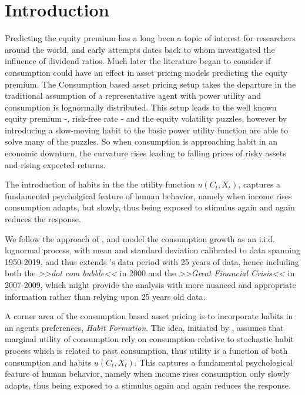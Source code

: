\section{Introduction} \label{sec:Introduction}

Predicting the equity premium has a long been a topic of interest for researchers around the world, and early attempts dates back to \cite{Dow1920} whom investigated the influence of dividend ratios. Much later the literature began to consider if consumption could have an effect in asset pricing models predicting the equity premium. The Consumption based asset pricing setup takes the departure in the traditional assumption of a representative agent with power utility and consumption is lognormally distributed. This setup leads to the well known equity premium -, risk-free rate - and the equity volatility puzzles, however by introducing a slow-moving habit to the basic power utility function \cite{Campbell1999} are able to solve many of the puzzles. So when consumption is approaching habit in an economic downturn, the curvature rises leading to falling prices of risky assets and rising expected returns. 


The introduction of habits in the the utility function $u \left(C_t, X_t \right)$, captures a fundamental psycholgical feature of human behavior, namely when income rises consumption adapts, but slowly, thus being exposed to stimulus again and again reduces the response.

We follow the approach of \cite{Campbell1999}, and model the consumption growth as an i.i.d. lognormal process, with mean and standard deviation calibrated to data spanning 1950-2019, and thus extends \cite{Campbell1999}'s data period with 25 years of data, hence including both the \textit{>>dot com bubble<<} in 2000 and the \textit{>>Great Financial Crisis<<} in 2007-2009, which might provide the analysis with more nuanced and appropriate information rather than relying upon 25 years old data.




\midrule

A corner area of the consumption based asset pricing is to incorporate habits in an agents preferences, \textit{Habit Formation}. The idea, initiated by \citet{Constantinides_1990}, assumes that marginal utility of consumption rely on consumption relative to stochastic habit process which is related to past consumption, thus utility is a function of both consumption and habits $u \left(C_t, X_t \right)$. This captures a fundamental psychological feature of human behavior, namely when income rises consumption only slowly adapts, thus being exposed to a stimulus again and again reduces the response. 

